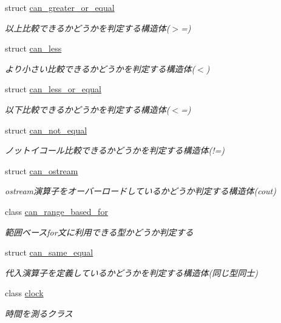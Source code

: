 \begin{DoxyCompactItemize}
struct \mbox{\hyperlink{structsaki_1_1can__greater__or__equal}{can\+\_\+greater\+\_\+or\+\_\+equal}}
\begin{DoxyCompactList}\small\item\em 以上比較できるかどうかを判定する構造体($>$=) \end{DoxyCompactList}\item 
struct \mbox{\hyperlink{structsaki_1_1can__less}{can\+\_\+less}}
\begin{DoxyCompactList}\small\item\em より小さい比較できるかどうかを判定する構造体($<$) \end{DoxyCompactList}\item 
struct \mbox{\hyperlink{structsaki_1_1can__less__or__equal}{can\+\_\+less\+\_\+or\+\_\+equal}}
\begin{DoxyCompactList}\small\item\em 以下比較できるかどうかを判定する構造体($<$=) \end{DoxyCompactList}\item 
struct \mbox{\hyperlink{structsaki_1_1can__not__equal}{can\+\_\+not\+\_\+equal}}
\begin{DoxyCompactList}\small\item\em ノットイコール比較できるかどうかを判定する構造体(!=) \end{DoxyCompactList}\item 
struct \mbox{\hyperlink{structsaki_1_1can__ostream}{can\+\_\+ostream}}
\begin{DoxyCompactList}\small\item\em ostream演算子をオーバーロードしているかどうか判定する構造体(cout) \end{DoxyCompactList}\item 
class \mbox{\hyperlink{classsaki_1_1can__range__based__for}{can\+\_\+range\+\_\+based\+\_\+for}}
\begin{DoxyCompactList}\small\item\em 範囲ベースfor文に利用できる型かどうか判定する \end{DoxyCompactList}\item 
struct \mbox{\hyperlink{structsaki_1_1can__same__equal}{can\+\_\+same\+\_\+equal}}
\begin{DoxyCompactList}\small\item\em 代入演算子を定義しているかどうかを判定する構造体(同じ型同士) \end{DoxyCompactList}\item 
class \mbox{\hyperlink{classsaki_1_1clock}{clock}}
\begin{DoxyCompactList}\small\item\em 時間を測るクラス \end{DoxyCompactList}\item 

\end{DoxyCompactItemize}
